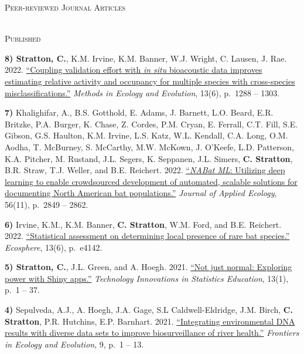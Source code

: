 \documentclass[a4paper]{article}
\newcommand{\lineunder} {
	\vspace*{-8pt} \\
	\hspace*{-18pt} \hrulefill \\
}
\newcommand{\header} [1] {
	{\hspace*{-18pt}\vspace*{6pt} \textsc{#1}}
	\vspace*{-6pt} \lineunder
}
\newcommand{\subheader} [1] {
	{\hspace*{-9pt}\vspace*{6pt} \textsc{#1}}
	\vspace*{-6pt}
}
\begin{document}
\header{Peer-reviewed Journal Articles}
\vspace*{2mm}

\subheader{Published}
\vspace*{2mm}

\textbf{8) Stratton, C.}, K.M. Irvine, K.M. Banner, W.J. Wright, C.
Lausen, J. Rae. 2022.
\href{https://doi.org/10.1111/2041-210X.13831}{``Coupling validation
effort with \emph{in situ} bioacoustic data improves estimating relative
activity and occupancy for multiple species with cross-species
misclassifications.''} \textit{Methods in Ecology and Evolution}, 13(6),
p.~1288 -- 1303. \vspace*{2mm}

\textbf{7)} Khalighifar, A., B.S. Gotthold, E. Adams, J. Barnett, L.O.
Beard, E.R. Britzke, P.A. Burger, K. Chase, Z. Cordes, P.M. Cryan, E.
Ferrall, C.T. Fill, S.E. Gibson, G.S. Haulton, K.M. Irvine, L.S. Katz,
W.L. Kendall, C.A. Long, O.M. Aodha, T. McBurney, S. McCarthy, M.W.
McKown, J. O'Keefe, L.D. Patterson, K.A. Pitcher, M. Rustand, J.L.
Segers, K. Seppanen, J.L. Simers, \textbf{C. Stratton}, B.R. Straw, T.J.
Weller, and B.E. Reichert. 2022.
\href{https://doi.org/10.1111/1365-2664.14280}{``\emph{NABat ML}:
Utilizing deep learning to enable crowdsourced development of automated,
scalable solutions for documenting North American bat populations.''}
\textit{Journal of Applied Ecology}, 56(11), p.~2849 -- 2862.
\vspace*{2mm}

\textbf{6)} Irvine, K.M., K.M. Banner, \textbf{C. Stratton}, W.M. Ford,
and B.E. Reichert. 2022.
\href{https://doi.org/10.1002/ecs2.4142}{``Statistical assessment on
determining local presence of rare bat species.''} \textit{Ecosphere},
13(6), p.~e4142. \vspace*{2mm}

\textbf{5) Stratton, C.}, J.L. Green, and A. Hoegh. 2021.
\href{https://doi.org/10.5070/T513146468}{``Not just normal: Exploring
power with Shiny apps.''}
\textit{Technology Innovations in Statistics Education}, 13(1), p.~1 --
37. \vspace*{2mm}

\textbf{4)} Sepulveda, A.J., A. Hoegh, J.A. Gage, S.L Caldwell-Eldridge,
J.M. Birch, \textbf{C. Stratton}, P.R. Hutchins, E.P. Barnhart. 2021.
\href{https://doi.org/10.3389/fevo.2021.620715}{``Integrating
environmental DNA results with diverse data sets to improve
biosurveillance of river health.''}
\textit{Frontiers in Ecology and Evolution}, 9, p.~1 -- 13.
\vspace*{2mm}
\end{document}
